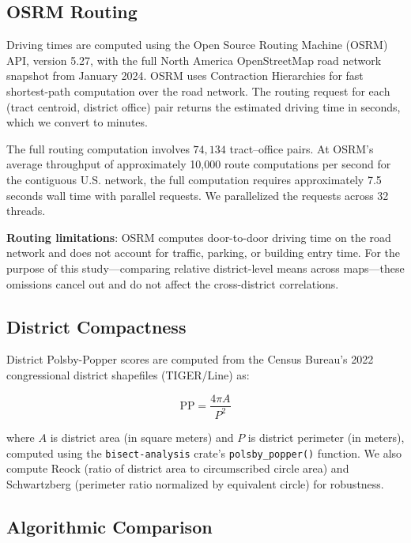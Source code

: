 \subsection{OSRM Routing}

Driving times are computed using the Open Source Routing Machine (OSRM) API,
version 5.27, with the full North America OpenStreetMap road network snapshot from
January 2024. OSRM uses Contraction Hierarchies for fast shortest-path computation
over the road network. The routing request for each (tract centroid, district office)
pair returns the estimated driving time in seconds, which we convert to minutes.

The full routing computation involves $74{,}134$ tract--office pairs. At OSRM's
average throughput of approximately 10{,}000 route computations per second for
the contiguous U.S. network, the full computation requires approximately 7.5 seconds
wall time with parallel requests. We parallelized the requests across 32 threads.

\textbf{Routing limitations}: OSRM computes door-to-door driving time on the road network
and does not account for traffic, parking, or building entry time. For the purpose of
this study---comparing relative district-level means across maps---these omissions
cancel out and do not affect the cross-district correlations.

\subsection{District Compactness}

District Polsby-Popper scores are computed from the Census Bureau's 2022 congressional
district shapefiles (TIGER/Line) as:

\begin{equation}
\text{PP} = \frac{4\pi A}{P^2}
\end{equation}

where $A$ is district area (in square meters) and $P$ is district perimeter (in meters),
computed using the \texttt{bisect-analysis} crate's \texttt{polsby\_popper()} function.
We also compute Reock (ratio of district area to circumscribed circle area) and
Schwartzberg (perimeter ratio normalized by equivalent circle) for robustness.

\subsection{Algorithmic Comparison}

